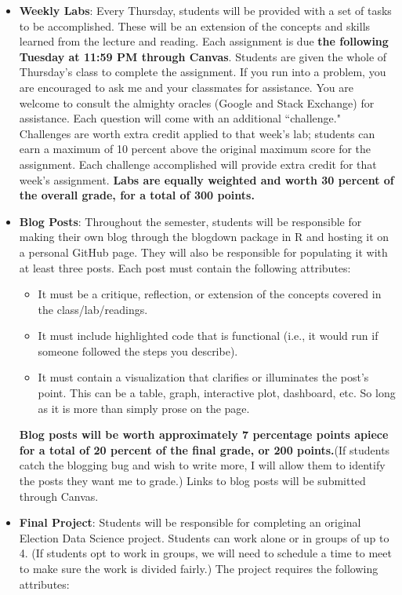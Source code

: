 \documentclass[11pt]{article}
\begin{document}
\begin{itemize}
\item \textbf{Weekly Labs}: Every Thursday, students will be provided with a set of tasks to be accomplished. These will be an extension of the concepts and skills learned from the lecture and reading. Each assignment is due \textbf{the following Tuesday at 11:59 PM through Canvas}. Students are given the whole of Thursday's class to complete the assignment. If you run into a problem, you are encouraged to ask me and your classmates for assistance. You are welcome to consult the almighty oracles (Google and Stack Exchange) for assistance. Each question will come with an additional ``challenge." Challenges are worth extra credit applied to that week's lab; students can earn a maximum of 10 percent above the original maximum score for the assignment. Each challenge accomplished will provide extra credit for that week's assignment. \textbf{Labs are equally weighted and worth 30 percent of the overall grade, for a total of 300 points.}
\item \textbf{Blog Posts}: Throughout the semester, students will be responsible for making their own blog through the blogdown package in R and hosting it on a personal GitHub page. They will also be responsible for populating it with at least three posts. Each post must contain the following attributes:
\begin{itemize}
\item It must be a critique, reflection, or extension of the concepts covered in the class/lab/readings.
\item It must include highlighted code that is functional (i.e., it would run if someone followed the steps you describe).
\item It must contain a visualization that clarifies or illuminates the post's point. This can be a table, graph, interactive plot, dashboard, etc. So long as it is more than simply prose on the page. 
\end{itemize}
\textbf{Blog posts will be worth approximately 7 percentage points apiece for a total of 20 percent of the final grade, or 200 points.}(If students catch the blogging bug and wish to write more, I will allow them to identify the posts they want me to grade.) Links to blog posts will be submitted through Canvas. 

\item \textbf{Final Project}: Students will be responsible for completing an original Election Data Science project. Students can work alone or in groups of up to 4. (If students opt to work in groups, we will need to schedule a time to meet to make sure the work is divided fairly.) The project requires the following attributes:


\end{itemize}
\end{document}
